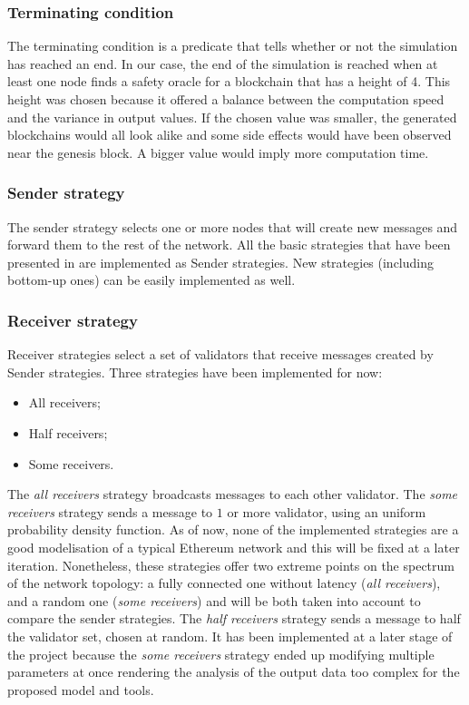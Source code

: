 \subsubsection{Terminating condition}
The terminating condition is a predicate that tells whether or not the simulation has
reached an end. In our case, the end of the simulation is reached when at least
one node finds a safety oracle for a blockchain that has a height of 4. This
height was chosen because it offered a balance between the computation speed and
the variance in output values. If the chosen value was smaller, the generated
blockchains would all look alike and some side effects would have been observed
near the genesis block. A bigger value would imply more computation time.

\subsubsection{Sender strategy}
The sender strategy selects one or more nodes that will create new messages and
forward them to the rest of the network. All the basic strategies that have been
presented in  are implemented as Sender strategies.
New strategies (including bottom-up ones) can be easily implemented as well.

\subsubsection{Receiver strategy}
Receiver strategies select a set of validators that receive messages created by
Sender strategies. Three strategies have been implemented for now: 
\begin{itemize}
        \item All receivers;
        \item Half receivers;
        \item Some receivers.
\end{itemize}

The \textit{all receivers} strategy broadcasts messages to each other validator.
The \textit{some receivers} strategy sends a message to \(1\) or more validator,
using an uniform probability density function.  As of now, none of the
implemented strategies are a good modelisation of a typical Ethereum network and
this will be fixed at a later iteration.  Nonetheless, these strategies offer
two extreme points on the spectrum of the network topology: a fully connected
one without latency (\textit{all receivers}), and a random one (\textit{some
receivers}) and will be both taken into account to compare the sender
strategies.
The \textit{half receivers} strategy sends a message to half the validator set,
chosen at random. It has been implemented at a later stage of the project
because the \textit{some receivers} strategy ended up modifying multiple
parameters at once rendering the analysis of the output data too complex for the
proposed model and tools.

